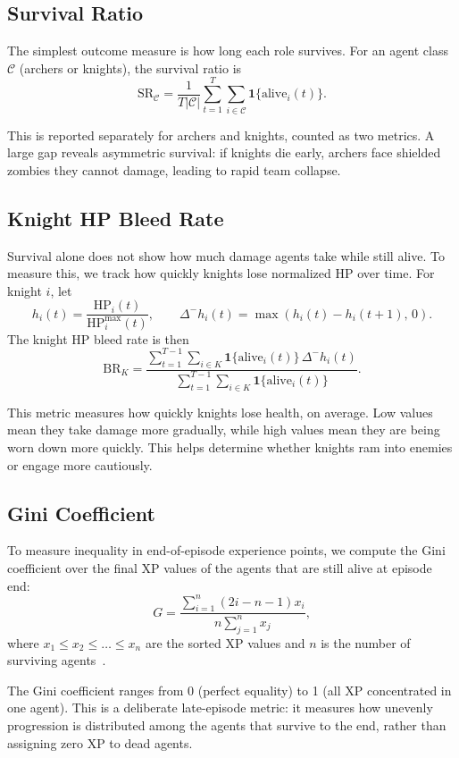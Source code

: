 \subsection{Survival Ratio}

The simplest outcome measure is how long each role survives. For an agent class $\mathcal{C}$ (archers or knights), the survival ratio is
\[
\mathrm{SR}_{\mathcal{C}}
=
\frac{1}{T|\mathcal{C}|}
\sum_{t=1}^{T}\sum_{i\in\mathcal{C}} \mathbf{1}\{\mathrm{alive}_i(t)\}.
\]

This is reported separately for archers and knights, counted as two metrics. A large gap reveals asymmetric survival: if knights die early, archers face shielded zombies they cannot damage, leading to rapid team collapse.

\subsection{Knight HP Bleed Rate}

Survival alone does not show how much damage agents take while still alive. To measure this, we track how quickly knights lose normalized HP over time. For knight $i$, let
\[
h_i(t)=\frac{\mathrm{HP}_i(t)}{\mathrm{HP}^{\max}_i(t)},
\qquad
\Delta^- h_i(t)=\max\!\left(h_i(t)-h_i(t+1),\,0\right).
\]
The knight HP bleed rate is then
\[
\mathrm{BR}_K=
\frac{\sum_{t=1}^{T-1}\sum_{i\in K}\mathbf{1}\{\mathrm{alive}_i(t)\}\,\Delta^- h_i(t)}
{\sum_{t=1}^{T-1}\sum_{i\in K}\mathbf{1}\{\mathrm{alive}_i(t)\}}.
\]

This metric measures how quickly knights lose health, on average. Low values mean they take damage more gradually, while high values mean they are being worn down more quickly. This helps determine whether knights ram into enemies or engage more cautiously.

\subsection{Gini Coefficient}
To measure inequality in end-of-episode experience points, we compute the Gini coefficient over the final XP values of the agents that are still alive at episode end:
\[
G =
\frac{\sum_{i=1}^{n}(2i-n-1)x_i}{n\sum_{j=1}^{n}x_j},
\]
where $x_1 \le x_2 \le \dots \le x_n$ are the sorted XP values and $n$ is the number of surviving agents~\cite{ceriani2012origins}.

The Gini coefficient ranges from 0 (perfect equality) to 1 (all XP concentrated in one agent). This is a deliberate late-episode metric: it measures how unevenly progression is distributed among the agents that survive to the end, rather than assigning zero XP to dead agents.


